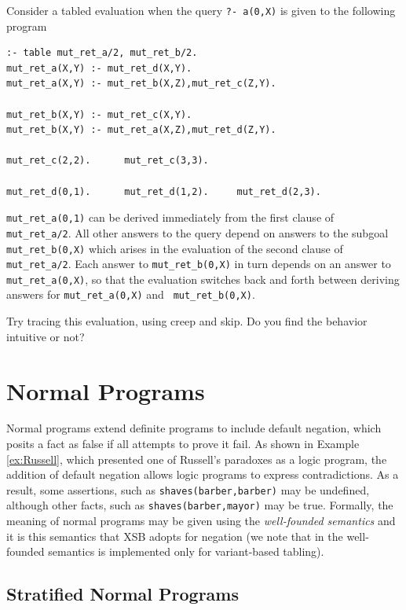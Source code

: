 \begin{exercise} \label{ex:scc}

Consider a tabled evaluation when the query {\tt ?- a(0,X)} is given
to the following program
\begin{verbatim}
:- table mut_ret_a/2, mut_ret_b/2.
mut_ret_a(X,Y) :- mut_ret_d(X,Y).
mut_ret_a(X,Y) :- mut_ret_b(X,Z),mut_ret_c(Z,Y).

mut_ret_b(X,Y) :- mut_ret_c(X,Y).
mut_ret_b(X,Y) :- mut_ret_a(X,Z),mut_ret_d(Z,Y).

mut_ret_c(2,2).      mut_ret_c(3,3).

mut_ret_d(0,1).	     mut_ret_d(1,2).     mut_ret_d(2,3).
\end{verbatim}
{\tt mut\_ret\_a(0,1)} can be derived immediately from the first
clause of {\tt mut\_ret\_a/2}.  All other answers to the query depend
on answers to the subgoal {\tt mut\_ret\_b(0,X)} which arises in the
evaluation of the second clause of {\tt mut\_ret\_a/2}.  Each answer
to {\tt mut\_ret\_b(0,X)} in turn depends on an answer to {\tt
mut\_ret\_a(0,X)}, so that the evaluation switches back and forth
between deriving answers for {\tt mut\_ret\_a(0,X)} and {\tt
mut\_ret\_b(0,X)}.

Try tracing this evaluation, using creep and skip.  Do you find the
behavior intuitive or not?\fillBox
\end{exercise}


\section{Normal Programs}
Normal programs extend definite programs to include default negation,
which posits a fact as false if all attempts to prove it fail.  As
shown in Example \ref{ex:Russell}, which presented one of Russell's
paradoxes as a logic program, the addition of default negation allows
logic programs to express contradictions.  As a result, some
assertions, such as {\tt shaves(barber,barber)} may be undefined,
although other facts, such as {\tt shaves(barber,mayor)} may be true.
Formally, the meaning of normal programs may be given using the {\em
well-founded semantics} and it is this semantics that XSB adopts for
negation (we note that in \version{} the well-founded semantics is
implemented only for variant-based tabling).

\subsection{Stratified Normal Programs}

